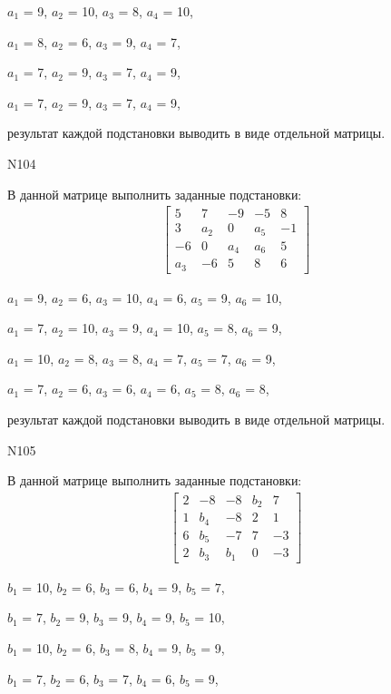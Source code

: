 \documentclass[11pt]{report}
\begin{document}
$a_{1}$ = 9, $a_{2}$ = 10, $a_{3}$ = 8, $a_{4}$ = 10, 

$a_{1}$ = 8, $a_{2}$ = 6, $a_{3}$ = 9, $a_{4}$ = 7, 

$a_{1}$ = 7, $a_{2}$ = 9, $a_{3}$ = 7, $a_{4}$ = 9, 

$a_{1}$ = 7, $a_{2}$ = 9, $a_{3}$ = 7, $a_{4}$ = 9, 

результат каждой подстановки выводить в виде отдельной матрицы.

N104

В данной матрице выполнить заданные подстановки:
\begin{align*}
\left[\begin{matrix}5 & 7 & -9 & -5 & 8\\3 & a_{2} & 0 & a_{5} & -1\\-6 & 0 & a_{4} & a_{6} & 5\\a_{3} & -6 & 5 & 8 & 6\end{matrix}\right]
\end{align*}


$a_{1}$ = 9, $a_{2}$ = 6, $a_{3}$ = 10, $a_{4}$ = 6, $a_{5}$ = 9, $a_{6}$ = 10, 

$a_{1}$ = 7, $a_{2}$ = 10, $a_{3}$ = 9, $a_{4}$ = 10, $a_{5}$ = 8, $a_{6}$ = 9, 

$a_{1}$ = 10, $a_{2}$ = 8, $a_{3}$ = 8, $a_{4}$ = 7, $a_{5}$ = 7, $a_{6}$ = 9, 

$a_{1}$ = 7, $a_{2}$ = 6, $a_{3}$ = 6, $a_{4}$ = 6, $a_{5}$ = 8, $a_{6}$ = 8, 

результат каждой подстановки выводить в виде отдельной матрицы.

N105

В данной матрице выполнить заданные подстановки:
\begin{align*}
\left[\begin{matrix}2 & -8 & -8 & b_{2} & 7\\1 & b_{4} & -8 & 2 & 1\\6 & b_{5} & -7 & 7 & -3\\2 & b_{3} & b_{1} & 0 & -3\end{matrix}\right]
\end{align*}


$b_{1}$ = 10, $b_{2}$ = 6, $b_{3}$ = 6, $b_{4}$ = 9, $b_{5}$ = 7, 

$b_{1}$ = 7, $b_{2}$ = 9, $b_{3}$ = 9, $b_{4}$ = 9, $b_{5}$ = 10, 

$b_{1}$ = 10, $b_{2}$ = 6, $b_{3}$ = 8, $b_{4}$ = 9, $b_{5}$ = 9, 

$b_{1}$ = 7, $b_{2}$ = 6, $b_{3}$ = 7, $b_{4}$ = 6, $b_{5}$ = 9, 
\end{document}
